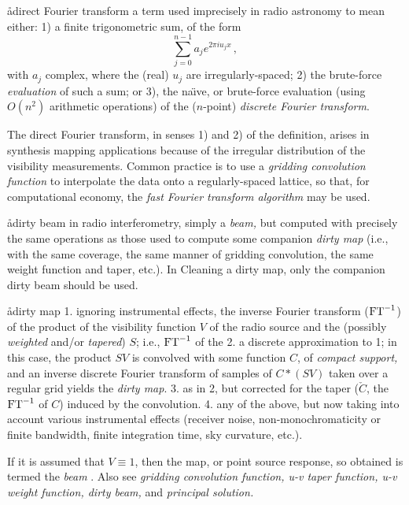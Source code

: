 \aa{direct Fourier transform}
a term used imprecisely in radio astronomy to mean either:
1) a finite trigonometric sum, of the form
$$\sum_{j=0}^{n-1}a_j e^{2\pi iu_jx}\,,$$
with $a_j$ complex, where the (real) $u_j$ are irregularly-spaced;
2) the brute-force {\sl evaluation} of such a sum;
or 3), the na\"\i ve, or brute-force evaluation (using $O(n^2)$
arithmetic operations) of the ($n$-point) {\it discrete Fourier transform}.
\par
The direct Fourier transform, in senses 1) and 2) of the definition,
arises in synthesis mapping applications because of the irregular
distribution of the visibility measurements.
Common practice is to use a {\it gridding convolution
function} to interpolate the data onto a regularly-spaced lattice,
so that, for computational economy,
the {\it fast Fourier transform algorithm} may be used.

\aa{dirty beam}
in radio interferometry, simply a {\it beam,}
but computed with precisely the same operations as
those used to compute some companion {\it dirty map}
(i.e., with the same \uv coverage, the same manner of gridding
convolution, the same \uv weight function and taper, etc.).
In Cleaning a dirty map, only the companion dirty beam should be used.

\aa{dirty map}
1. ignoring instrumental effects, the inverse Fourier transform
($\hbox{\rm FT}^{-1}$) of the product of the visibility function $V$
of the radio source and the (possibly {\it weighted}
and\slash or {\it tapered}\/)  $S$;
i.e., $\hbox{\rm FT}^{-1}$ of the 
\xspace2.
a discrete approximation to 1;
in this case, the product $SV$ is convolved with some function
$C$, of {\it compact support,} and an inverse discrete Fourier transform
of samples of $C\ast(SV)$ taken over a regular grid yields the
{\it dirty map}.
\xspace3.
as in 2, but corrected for the taper ($\check C$, the $\hbox{\rm FT}^{-1}$ of $C$)
induced by the convolution.
\xspace4.
any of the above, but now taking into account various instrumental
effects (receiver noise, non-monochromaticity or finite bandwidth, finite
integration time, sky curvature, etc.).
\par
If it is assumed that $V\equiv1$, then the map,
or point source response, so obtained is termed the {\it beam} \qv.
Also see {\it gridding convolution function, u-v taper function,
u-v weight function, dirty beam,} and {\it principal solution.}

